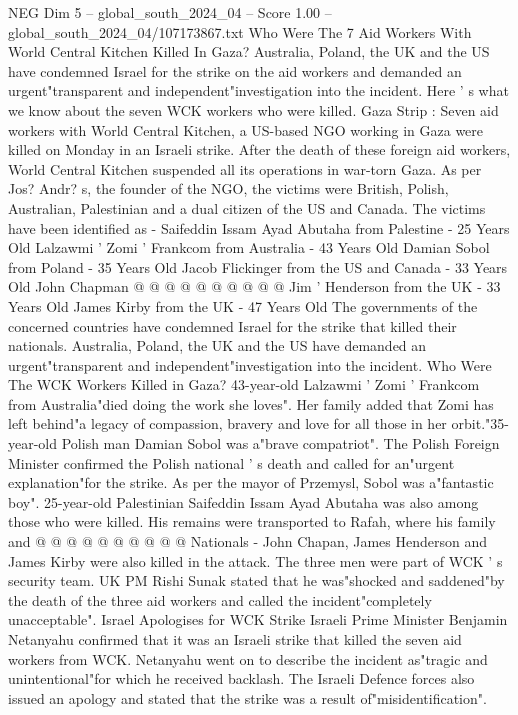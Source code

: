 \begin{textsample}{NEG Dim 5 – global\_south\_2024\_04 – Score 1.00 – global\_south\_2024\_04/107173867.txt}  \label{ex:f5_neg_119}
Who Were The 7 Aid Workers With World Central Kitchen Killed In Gaza?
Australia, Poland, the UK and the US have condemned Israel for the strike on the aid workers and demanded an urgent"transparent and independent"investigation into the incident.
Here ' s what we know about the seven WCK workers who were killed.
Gaza Strip : Seven aid workers with World Central Kitchen, a US-based NGO working in Gaza were killed on Monday in an Israeli strike.
After the death of these foreign aid workers, World Central Kitchen suspended all its operations in war-torn Gaza.
As per Jos?
Andr? s, the founder of the NGO, the victims were British, Polish, Australian, Palestinian and a dual citizen of the US and Canada.
The victims have been identified as - Saifeddin Issam Ayad Abutaha from Palestine - 25 Years Old Lalzawmi ' Zomi ' Frankcom from Australia - 43 Years Old Damian Sobol from Poland - 35 Years Old Jacob Flickinger from the US and Canada - 33 Years Old John Chapman @ @ @ @ @ @ @ @ @ @ Jim ' Henderson from the UK - 33 Years Old James Kirby from the UK - 47 Years Old The governments of the concerned countries have condemned Israel for the strike that killed their nationals.
Australia, Poland, the UK and the US have demanded an urgent"transparent and independent"investigation into the incident.
Who Were The WCK Workers Killed in Gaza? 43-year-old Lalzawmi ' Zomi ' Frankcom from Australia"died doing the work she loves".
Her family added that Zomi has left behind"a legacy of compassion, bravery and love for all those in her orbit."35-year-old Polish man Damian Sobol was a"brave compatriot".
The Polish Foreign Minister confirmed the Polish national ' s death and called for an"urgent explanation"for the strike.
As per the mayor of Przemysl, Sobol was a"fantastic boy". 25-year-old Palestinian Saifeddin Issam Ayad Abutaha was also among those who were killed.
His remains were transported to Rafah, where his family and @ @ @ @ @ @ @ @ @ @ Nationals - John Chapan, James Henderson and James Kirby were also killed in the attack.
The three men were part of WCK ' s security team.
UK PM Rishi Sunak stated that he was"shocked and saddened"by the death of the three aid workers and called the incident"completely unacceptable".
Israel Apologises for WCK Strike Israeli Prime Minister Benjamin Netanyahu confirmed that it was an Israeli strike that killed the seven aid workers from WCK.
Netanyahu went on to describe the incident as"tragic and unintentional"for which he received backlash.
The Israeli Defence forces also issued an apology and stated that the strike was a result of"misidentification".

\end{textsample}
